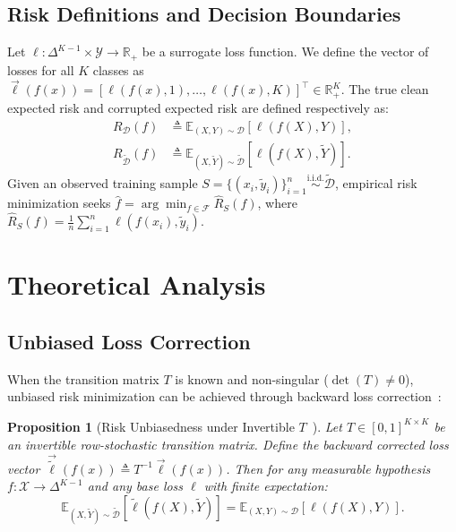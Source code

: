 \documentclass[journal]{IEEEtran}
\newtheorem{proposition}{Proposition}
\theoremstyle{definition}
\begin{document}
\subsection{Risk Definitions and Decision Boundaries}
Let $\ell: \Delta^{K-1} \times \mathcal{Y} \to \mathbb{R}_+$ be a surrogate loss function. We define the vector of losses for all $K$ classes as $\vec{\ell}(f(x)) = [\ell(f(x), 1), \dots, \ell(f(x), K)]^\top \in \mathbb{R}_+^K$. The true clean expected risk and corrupted expected risk are defined respectively as:
\begin{align}
R_{\mathcal{D}}(f) &\triangleq \mathbb{E}_{(X, Y) \sim \mathcal{D}} [\ell(f(X), Y)], \\
R_{\tilde{\mathcal{D}}}(f) &\triangleq \mathbb{E}_{(X, \tilde{Y}) \sim \tilde{\mathcal{D}}} [\ell(f(X), \tilde{Y})].
\end{align}
Given an observed training sample $S = \{(x_i, \tilde{y}_i)\}_{i=1}^n \overset{\text{i.i.d.}}{\sim} \tilde{\mathcal{D}}$, empirical risk minimization seeks $\hat{f} = \arg\min_{f \in \mathcal{F}} \hat{R}_S(f)$, where $\hat{R}_S(f) = \frac{1}{n} \sum_{i=1}^n \ell(f(x_i), \tilde{y}_i)$.

\section{Theoretical Analysis}

\subsection{Unbiased Loss Correction}
When the transition matrix $T$ is known and non-singular ($\det(T) \ne 0$), unbiased risk minimization can be achieved through backward loss correction~\cite{natarajan2013learning,patrini2017making}:

\begin{proposition}[Risk Unbiasedness under Invertible $T$~\cite{natarajan2013learning,patrini2017making}]
\label{prop:unbiasedness}
Let $T \in [0, 1]^{K \times K}$ be an invertible row-stochastic transition matrix. Define the backward corrected loss vector $\vec{\tilde{\ell}}(f(x)) \triangleq T^{-1} \vec{\ell}(f(x))$. Then for any measurable hypothesis $f: \mathcal{X} \to \Delta^{K-1}$ and any base loss $\ell$ with finite expectation:
\begin{equation}
\mathbb{E}_{(X, \tilde{Y}) \sim \tilde{\mathcal{D}}} [\tilde{\ell}(f(X), \tilde{Y})] = \mathbb{E}_{(X, Y) \sim \mathcal{D}} [\ell(f(X), Y)].
\end{equation}
\end{proposition}
\end{document}
